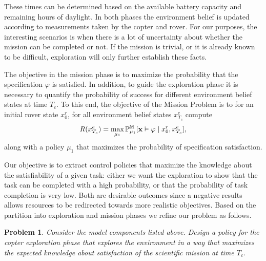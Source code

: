 \documentclass[conference]{IEEEtran}
\newtheorem{problem}{Problem}
\begin{document}
These times can be determined based on the available battery capacity and remaining hours of daylight. In both phases the environment belief is updated according to measurements taken by the copter and rover. For our purposes, the interesting scenarios is when there is a lot of uncertainty about whether the mission can be completed or not. If the mission is trivial, or it is already known to be difficult, exploration will only further establish these facts. \\

The objective in the mission phase is to maximize the probability that the specification $\varphi$ is satisfied. In addition, to guide the exploration phase it is necessary to quantify the probability of success for different environment belief states at time $T_c$. To this end, the objective of the Mission Problem is to for an initial rover state $x^r_{0}$, for all environment belief states $x^e_{T_c}$ compute
\begin{equation}
  \label{eq:mission}
 	R(x^e_{T_c}) = \max_{\mu_1}\mathbb P_{\mu_1}^\MDP[\mathbf x \vDash \varphi \mid x^r_0, x^e_{T_c} ],
\end{equation}
along with a policy $\mu_1$ that maximizes the probability of specification satisfaction.



Our objective is to extract control policies that maximize the knowledge about the satisfiability of a given task: either we want the exploration to show that the task can be completed with a high probability, or that the probability of task completion is very low. Both are desirable outcomes since a negative results allows resources to be redirected towards more realistic objectives. Based on the partition into exploration and mission phases we refine our problem as follows.
\begin{problem}
\label{prob:main}
  Consider the model components listed above. Design a policy for the copter exploration phase that explores the environment in a way that maximizes the expected knowledge about satisfaction of the scientific mission at time $T_c$.
\end{problem}
\end{document}
